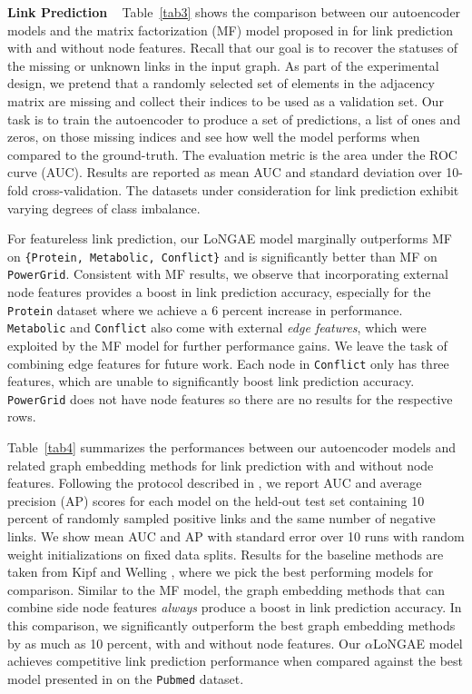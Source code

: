 \documentclass[letterpaper, conference]{IEEEtran}
\begin{document}
\noindent \textbf{Link Prediction} ~ Table~\ref{tab3} shows the comparison between our autoencoder models and the matrix factorization (MF) model proposed in \cite{Menon:2011} for link prediction with and without node features. Recall that our goal is to recover the statuses of the missing or unknown links in the input graph. As part of the experimental design, we pretend that a randomly selected set of elements in the adjacency matrix are missing and collect their indices to be used as a validation set. Our task is to train the autoencoder to produce a set of predictions, a list of ones and zeros, on those missing indices and see how well the model performs when compared to the ground-truth. The evaluation metric is the area under the ROC curve (AUC). Results are reported as mean AUC and standard deviation over 10-fold cross-validation. The datasets under consideration for link prediction exhibit varying degrees of class imbalance.

For featureless link prediction, our LoNGAE model marginally outperforms MF on \texttt{\{Protein, Metabolic, Conflict\}} and is significantly better than MF on \texttt{PowerGrid}. Consistent with MF results, we observe that incorporating external node features provides a boost in link prediction accuracy, especially for the \texttt{Protein} dataset where we achieve a 6 percent increase in performance. \texttt{Metabolic} and \texttt{Conflict} also come with external \emph{edge features}, which were exploited by the MF model for further performance gains. We leave the task of combining edge features for future work. Each node in \texttt{Conflict} only has three features, which are unable to significantly boost link prediction accuracy. \texttt{PowerGrid} does not have node features so there are no results for the respective rows.

Table~\ref{tab4} summarizes the performances between our autoencoder models and related graph embedding methods for link prediction with and without node features. Following the protocol described in \cite{VGAE:2016}, we report AUC and average precision (AP) scores for each model on the held-out test set containing 10 percent of randomly sampled positive links and the same number of negative links. We show mean AUC and AP with standard error over 10 runs with random weight initializations on fixed data splits. Results for the baseline methods are taken from Kipf and Welling \cite{VGAE:2016}, where we pick the best performing models for comparison. Similar to the MF model, the graph embedding methods that can combine side node features \emph{always} produce a boost in link prediction accuracy. In this comparison, we significantly outperform the best graph embedding methods by as much as 10 percent, with and without node features. Our $\alpha$LoNGAE model achieves competitive link prediction performance when compared against the best model presented in \cite{VGAE:2016} on the \texttt{Pubmed} dataset.
\end{document}
